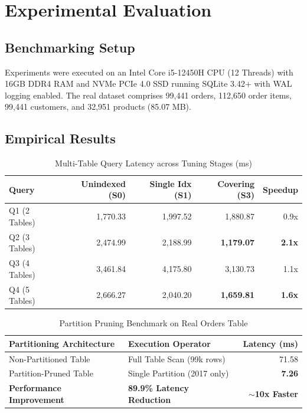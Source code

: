 \documentclass[journal]{IEEEtran}
\begin{document}
\section{Experimental Evaluation}
\subsection{Benchmarking Setup}
Experiments were executed on an Intel Core i5-12450H CPU (12 Threads) with 16GB DDR4 RAM and NVMe PCIe 4.0 SSD running SQLite 3.42+ with WAL logging enabled. The real dataset comprises 99,441 orders, 112,650 order items, 99,441 customers, and 32,951 products (85.07 MB).

\subsection{Empirical Results}

\begin{table}[h]
\centering
\caption{Multi-Table Query Latency across Tuning Stages (ms)}
\begin{tabular}{lrrrr}
\toprule
Query & Unindexed (S0) & Single Idx (S1) & Covering (S3) & Speedup \\
\midrule
Q1 (2 Tables) & 1,770.33 & 1,997.52 & 1,880.87 & 0.9x \\
Q2 (3 Tables) & 2,474.99 & 2,188.99 & \textbf{1,179.07} & \textbf{2.1x} \\
Q3 (4 Tables) & 3,461.84 & 4,175.80 & 3,130.73 & 1.1x \\
Q4 (5 Tables) & 2,666.27 & 2,040.20 & \textbf{1,659.81} & \textbf{1.6x} \\
\bottomrule
\end{tabular}
\end{table}

\begin{table}[h]
\centering
\caption{Partition Pruning Benchmark on Real Orders Table}
\begin{tabular}{llr}
\toprule
Partitioning Architecture & Execution Operator & Latency (ms) \\
\midrule
Non-Partitioned Table & Full Table Scan (99k rows) & 71.58 \\
Partition-Pruned Table & Single Partition (2017 only) & \textbf{7.26} \\
\midrule
\textbf{Performance Improvement} & \textbf{89.9\% Latency Reduction} & \textbf{$\sim$10x Faster} \\
\bottomrule
\end{tabular}
\end{table}
\end{document}
